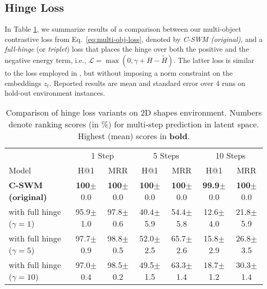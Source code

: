 \documentclass{article} %
\begin{document}
\subsection{Hinge Loss}
\label{sec:hinge-loss}
In Table \ref{tab:results_hinge}, we summarize results of a comparison between our multi-object contrastive loss from Eq.~\ref{eq:multi-obj-loss}, denoted by \textit{C-SWM (original)}, and a \textit{full-hinge} (or \textit{triplet}) loss that places the hinge over both the positive and the negative energy term, i.e., $\mathcal{L} = \max(0,\gamma + H - \tilde{H})$. The latter loss is similar to the loss employed in \citet{bordes2013translating}, but without imposing a norm constraint on the embeddings $z_t$. Reported results are mean and standard error over 4 runs on hold-out environment instances.

\begin{table}[htp!]
\centering
\caption{\label{tab:results_hinge}Comparison of hinge loss variants on 2D shapes environment. Numbers denote ranking scores (in \%) for multi-step prediction in latent space. Highest (mean) scores in \textbf{bold}.}
\begin{tabular}{lcccccc}
\toprule
   & \multicolumn{2}{c}{1 Step} & \multicolumn{2}{c}{5 Steps} & \multicolumn{2}{c}{10 Steps} \\ \cmidrule(lr){2-3} \cmidrule(lr){4-5} \cmidrule(lr){6-7}
Model & H@1 & MRR & H@1 & MRR & H@1 & MRR      \\ \midrule
\bf C-SWM (original)& {\bf100}{\color{lightgrey}\tiny$\pm$0.0} &  {\bf100}{\color{lightgrey}\tiny$\pm$0.0} & {\bf100}{\color{lightgrey}\tiny$\pm$0.0} & {\bf100}{\color{lightgrey}\tiny$\pm$0.0} & {\bf99.9}{\color{lightgrey}\tiny$\pm$0.0} & {\bf100}{\color{lightgrey}\tiny$\pm$0.0} \\
with full hinge ($\gamma=1$) & 95.9{\color{lightgrey}\tiny$\pm$1.0} & 97.8{\color{lightgrey}\tiny$\pm$0.6} & 40.4{\color{lightgrey}\tiny$\pm$5.9}  & 54.4{\color{lightgrey}\tiny$\pm$5.8} & 12.6{\color{lightgrey}\tiny$\pm$4.0}  & 21.8{\color{lightgrey}\tiny$\pm$5.9} \\
with full hinge ($\gamma=5$) & 97.7{\color{lightgrey}\tiny$\pm$0.9}  & 98.8{\color{lightgrey}\tiny$\pm$0.5} & 52.0{\color{lightgrey}\tiny$\pm$2.5}  & 65.7{\color{lightgrey}\tiny$\pm$2.6} & 15.8{\color{lightgrey}\tiny$\pm$2.9}  & 26.8{\color{lightgrey}\tiny$\pm$3.5} \\
with full hinge ($\gamma=10$) & 97.0{\color{lightgrey}\tiny$\pm$0.4}  & 98.5{\color{lightgrey}\tiny$\pm$0.2} & 49.5{\color{lightgrey}\tiny$\pm$1.5}  & 63.3{\color{lightgrey}\tiny$\pm$1.4} & 18.7{\color{lightgrey}\tiny$\pm$1.2}  & 30.3{\color{lightgrey}\tiny$\pm$1.4} \\
\bottomrule
\end{tabular}
\end{table}
\end{document}
